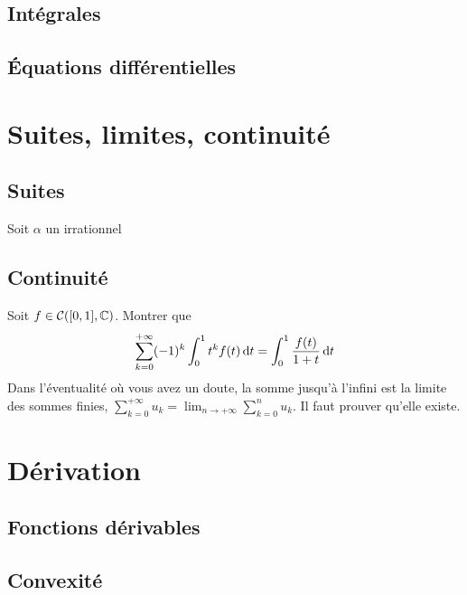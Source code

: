 \documentclass[12pt,a4paper]{exo_book}
\begin{document}
\section{Intégrales}

\section{Équations différentielles}

\chapter{Suites, limites, continuité}

\section{Suites}

\begin{exo}
    Soit $\alpha$ un irrationnel
\end{exo}


\section{Continuité}

\begin{exo}
    Soit $f \in \mathcal{C}([0,1], \mathbb{C})$. Montrer que
    \[\sum_{k=0}^{+\infty} (-1)^k \int_0^1 t^k f(t) {\rm \, d} t = \int_0^1 \frac{f(t)}{1+t} {\rm \, d} t\]
    Dans l'éventualité où vous avez un doute, la somme jusqu'à l'infini est la limite des sommes finies, $\sum_{k=0}^{+\infty} u_k = \lim_{n\to +\infty} \sum_{k=0}^n u_k$. Il faut prouver qu'elle existe.
\end{exo}


\chapter{Dérivation}

\section{Fonctions dérivables}

\section{Convexité}
\end{document}
